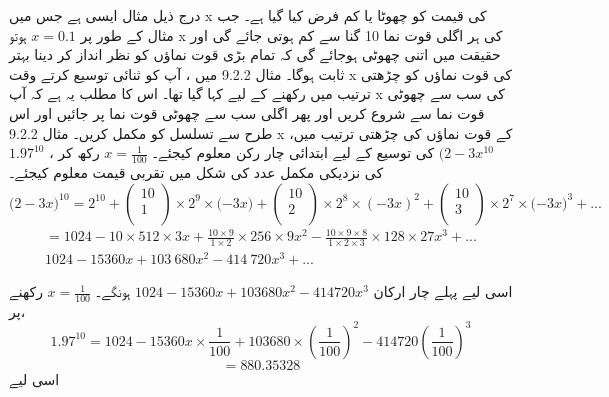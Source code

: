 درج ذیل مثال ایسی ہے جس میں  
x
کی قیمت کو چھوٹا یا کم فرض کیا گیا ہے۔   جب مثال کے طور پر  
\(x=0.1\)
ہوتو   
x
کی ہر اگلی قوت نما  
10
  گنا سے کم ہوتی جائے گی اور حقیقت میں اتنی چھوٹی ہوجائے گی کہ تمام بڑی قوت نماؤں کو نظر  انداز  کر دینا  بہتر  ثابت  ہوگا۔  
مثال 
9.2.2
  میں ،   آپ کو  ثنائی  توسیع  کرتے وقت  
x
کی قوت نماؤں کو  چڑھتی ترتیب میں رکھنے کے لیے کہا گیا تھا۔  اس کا مطلب یہ ہے کہ آپ
x
   کی سب سے چھوٹی قوت نما سے شروع کریں اور پھر اگلی سب سے چھوٹی قوت نما پر جائیں اور اس طرح سے تسلسل کو مکمل کریں۔ 
مثال  
9.2.2
x
کے قوت نماؤں کی چڑھتی ترتیب میں،  
\((2-3{x}^{10}\)
کی توسیع کے لیے ابتدائی چار رکن معلوم کیجئے۔  
 \(x=\frac{1}{100}\)
  رکھ کر  ،  
\(1.97^{10}\)
 کی نزدیکی مکمل عدد کی شکل میں تقربی قیمت  معلوم کیجئے۔ 
 \[(2-3{x)}^{10}= {2}^{10}+
\begin{pmatrix}
10\\
1\\
\end{pmatrix}
\times{2}^{9}\times{(-3{x)}}+
\begin{pmatrix}
10\\
2\\
\end{pmatrix}
\times{2}^{8}\times{(-3{x})^{2}}+ \begin{pmatrix}
10\\
3\\
\end{pmatrix}\times{2}^{7}\times{(-3{x)}}^{3}+... \]
\begin{align*}
=1024-10\times512\times3{x}+{\frac{10\times9}{1\times2}}\times256\times9{x}^{2}-{\frac{10\times9\times8}{1\times2\times3}}\times128\times27{x}^{3}+...\\
 1024-15360x+103\ 680{x}^{2}-414\ 720{x}^{3}+...
 \end{align*}


اسی لیے پہلے چار ارکان
\(1024-15 360{x}+103 680{x}^{2}-414720{x}^{3}\)
ہونگے۔
\(x=\frac{1}{100}\)
رکھنے پر،
\[1.97^{10}=1024-15360{x}\times\frac{1}{100}+103 680\times(\frac{1}{100})^{2}-414720(\frac{1}{100})^{3}\]
\[=880.35328\]
اسی لیے

